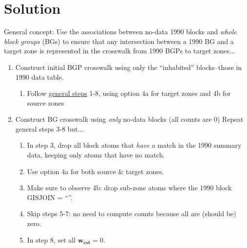 \documentclass{article}
\begin{document}
\section{Solution}

General concept: Use the associations between no-data 1990 blocks and \textit{whole block groups} (BGs) to ensure that any intersection between a 1990 BG and a target zone is represented in the crosswalk from 1990 BGPs to target zones...

\begin{enumerate}

\item Construct initial BGP crosswalk using only the ``inhabited'' blocks--those in 1990 data table.
    \begin{enumerate}
    \item Follow \href{https://github.com/jGaboardi/nhgisxwalk/blob/master/resources/general-crosswalk-construction-framework.pdf}{general steps} 1-8, using option 4a for target zones and 4b for source zones
    \end{enumerate}

\item Construct BG crosswalk using \textit{only} no-data blocks (all counts are 0)
Repeat general steps 3-8 but...
    \begin{enumerate}
    \item In step 3, drop all block atoms that \textit{have} a match in the 1990 summary data, keeping only atoms that have no match.
    \item Use option 4a for both source \& target zones.
    \item Make sure to observe 4b: drop sub-zone atoms where the 1990 block GISJOIN = ``''.
    \item Skip steps 5-7: no need to compute counts because all are (should be) zero.
    \item In step 8, set all $\bm{w_{\mathbf{cst}}} = 0$.
    \end{enumerate}
    

\end{enumerate}
\end{document}
